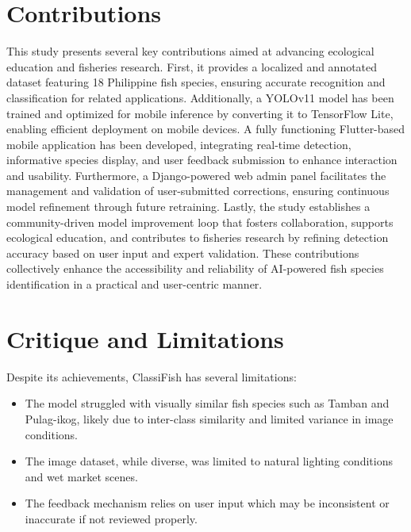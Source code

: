 \section{Contributions}
This study presents several key contributions aimed at advancing ecological education and fisheries research. First, it provides a localized and annotated dataset featuring 18 Philippine fish species, ensuring accurate recognition and classification for related applications. Additionally, a YOLOv11 model has been trained and optimized for mobile inference by converting it to TensorFlow Lite, enabling efficient deployment on mobile devices. A fully functioning Flutter-based mobile application has been developed, integrating real-time detection, informative species display, and user feedback submission to enhance interaction and usability. Furthermore, a Django-powered web admin panel facilitates the management and validation of user-submitted corrections, ensuring continuous model refinement through future retraining. Lastly, the study establishes a community-driven model improvement loop that fosters collaboration, supports ecological education, and contributes to fisheries research by refining detection accuracy based on user input and expert validation. These contributions collectively enhance the accessibility and reliability of AI-powered fish species identification in a practical and user-centric manner.

\section{Critique and Limitations}
Despite its achievements, ClassiFish has several limitations:
\begin{itemize}
    \item The model struggled with visually similar fish species such as Tamban and Pulag-ikog, likely due to inter-class similarity and limited variance in image conditions.
    \item The image dataset, while diverse, was limited to natural lighting conditions and wet market scenes.
    \item The feedback mechanism relies on user input which may be inconsistent or inaccurate if not reviewed properly.
\end{itemize}

